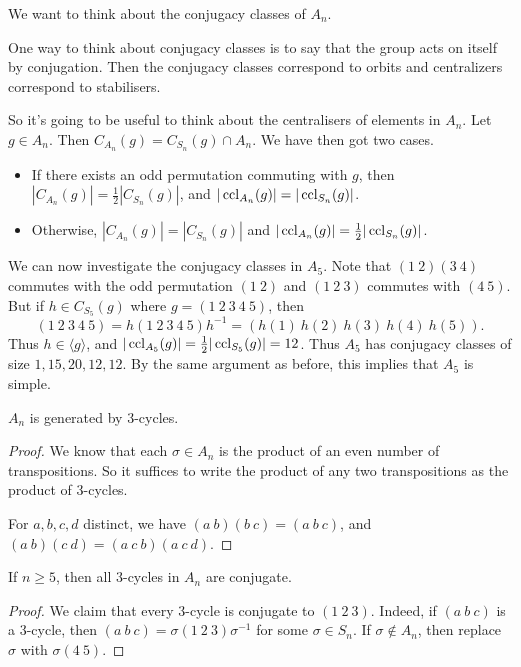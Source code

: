 \documentclass[a4paper]{scrartcl}
\begin{document}
We want to think about the conjugacy classes of $A_n$.


One way to think about conjugacy classes is to say that the group acts on itself by conjugation. Then the conjugacy classes correspond to orbits and centralizers correspond to stabilisers.

So it's going to be useful to think about the centralisers of elements in $A_n$. 
Let $g \in A_n$. Then $C_{A_n}(g) = C_{S_n}(g) \cap A_n$. We have then got two cases.
\begin{itemize}
	\item If there exists an odd permutation commuting with $g$, then $|C_{A_n}(g)| = \frac{1}{2}|C_{S_n}(g)|$, and $|\operatorname{ccl}_{A_n}(g)| = |\operatorname{ccl}_{S_n}(g)|$.
	\item  Otherwise, $|C_{A_n}(g)| = |C_{S_n}(g)|$ and $|\operatorname{ccl}_{A_n}(g)| = \frac{1}{2}|\operatorname{ccl}_{S_n}(g)|$.
\end{itemize}

\begin{example}
	We can now investigate the conjugacy classes in $A_5$. Note that $(1\ 2)(3\ 4)$ commutes with the odd permutation $(1\ 2)$ and $(1\ 2\ 3)$ commutes with $(4\ 5)$. But if $h \in C_{S_5}(g)$ where $g = (1\ 2\ 3\ 4\ 5)$, then
	$$
(1\ 2\ 3\ 4\ 5) = h (1\ 2\ 3\ 4\ 5) h^{-1} = (h(1)\ h(2)\ h(3)\ h(4)\ h(5)).
	$$
	Thus $h \in \langle g \rangle$, and $|\operatorname{ccl}_{A_5}(g)| = \frac{1}{2}|\operatorname{ccl}_{S_5}(g)| = 12$. Thus $A_5$ has conjugacy classes of size $1, 15, 20, 12, 12$. By the same argument as before, this implies that $A_5$ is simple.
\end{example}

\begin{lemma}[Generators of $A_n$]
	$A_n$ is generated by 3-cycles.
\end{lemma}
\begin{proof}
	We know that each $\sigma \in A_n$ is the product of an even number of transpositions. So it suffices to write the product of any two transpositions as the product of 3-cycles. 

	For $a, b, c, d$ distinct, we have $(a\ b)(b\ c) = (a\ b\ c)$, and $(a\ b)(c\ d) = (a\ c\ b)(a\ c\ d)$.
\end{proof}

\begin{lemma}
	If $n \geq 5$, then all $3$-cycles in $A_n$ are conjugate.
\end{lemma}
\begin{proof}
	We claim that every 3-cycle is conjugate to $(1\ 2\ 3)$. Indeed, if $(a\ b\ c)$ is a 3-cycle, then $(a\ b\ c)=\sigma (1\ 2\ 3)\sigma^{-1}$ for some $\sigma \in S_n$. If $\sigma \not \in A_n$, then replace $\sigma$ with $\sigma (4\ 5)$.
\end{proof}
\end{document}
